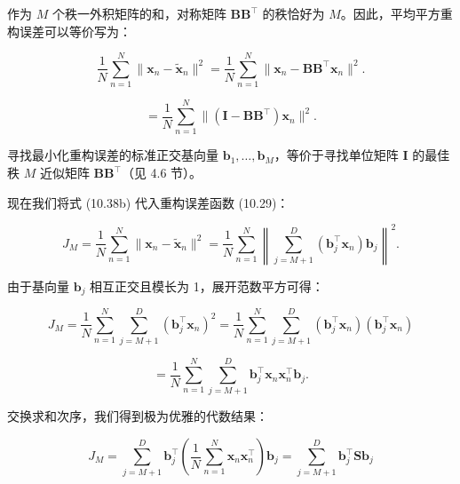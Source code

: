 作为 $ M $ 个秩一外积矩阵的和，对称矩阵 $ \boldsymbol{B}\boldsymbol{B}^\top $ 的秩恰好为 $ M $。因此，平均平方重构误差可以等价写为：

\begin{equation}
\frac{1}{N}\sum_{n=1}^N \|\boldsymbol{x}_n - \tilde{\boldsymbol{x}}_n\|^2 = \frac{1}{N}\sum_{n=1}^N \|\boldsymbol{x}_n - \boldsymbol{B}\boldsymbol{B}^\top \boldsymbol{x}_n\|^2 .
\tag{10.40a}
\end{equation}

\begin{equation}
= \frac{1}{N}\sum_{n=1}^N \|(\boldsymbol{I} - \boldsymbol{B}\boldsymbol{B}^\top)\boldsymbol{x}_n\|^2 .
\tag{10.40b}
\end{equation}

寻找最小化重构误差的标准正交基向量 $ \boldsymbol{b}_1, \ldots, \boldsymbol{b}_M $，等价于寻找单位矩阵 $ \boldsymbol{I} $ 的最佳秩 $ M $ 近似矩阵 $ \boldsymbol{B}\boldsymbol{B}^\top $（见 4.6 节）。

现在我们将式 (10.38b) 代入重构误差函数 (10.29)：

\begin{equation}
J_M = \frac{1}{N}\sum_{n=1}^N \|\boldsymbol{x}_n - \tilde{\boldsymbol{x}}_n\|^2 = \frac{1}{N}\sum_{n=1}^N \left\| \sum_{j=M+1}^D (\boldsymbol{b}_j^\top \boldsymbol{x}_n)\boldsymbol{b}_j \right\|^2 .
\tag{10.41}
\end{equation}

由于基向量 $ \boldsymbol{b}_j $ 相互正交且模长为 1，展开范数平方可得：

\begin{equation}
J_M = \frac{1}{N}\sum_{n=1}^N \sum_{j=M+1}^D (\boldsymbol{b}_j^\top \boldsymbol{x}_n)^2 = \frac{1}{N}\sum_{n=1}^N \sum_{j=M+1}^D (\boldsymbol{b}_j^\top \boldsymbol{x}_n)(\boldsymbol{b}_j^\top \boldsymbol{x}_n)
\tag{10.42a}
\end{equation}

\begin{equation}
= \frac{1}{N}\sum_{n=1}^N \sum_{j=M+1}^D \boldsymbol{b}_j^\top \boldsymbol{x}_n \boldsymbol{x}_n^\top \boldsymbol{b}_j .
\tag{10.42b}
\end{equation}

交换求和次序，我们得到极为优雅的代数结果：

\begin{equation}
J_M = \sum_{j=M+1}^D \boldsymbol{b}_j^\top \left( \frac{1}{N}\sum_{n=1}^N \boldsymbol{x}_n \boldsymbol{x}_n^\top \right) \boldsymbol{b}_j = \sum_{j=M+1}^D \boldsymbol{b}_j^\top \boldsymbol{S}\boldsymbol{b}_j
\tag{10.43a}
\end{equation}

